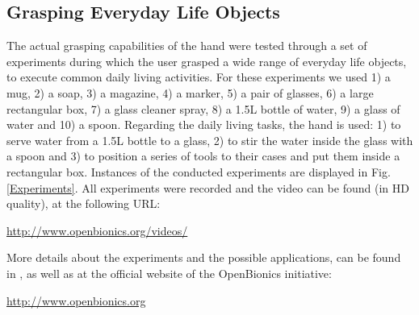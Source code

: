 \subsection{Grasping Everyday Life Objects}

The actual grasping capabilities of the hand were tested through a set of experiments during which the user grasped a wide range of everyday life objects, to execute common daily living activities. For these experiments we used 1) a mug, 2) a soap, 3) a magazine, 4)  a marker, 5) a pair of glasses, 6) a large rectangular box, 7) a glass cleaner spray, 8) a 1.5L bottle of water, 9) a glass of water and 10) a spoon. Regarding the daily living tasks, the hand is used: 1) to serve water from a 1.5L bottle to a glass, 2) to stir the water inside the glass with a spoon and 3) to position a series of tools to their cases and put them inside a rectangular box. Instances of the conducted experiments are displayed in Fig. \ref{Experiments}. All experiments were recorded and the video can be found (in HD quality), at the following URL: 
\begin{center}{\small{\url{http://www.openbionics.org/videos/}}}\end{center}

More details about the experiments and the possible applications, can be found in \cite{Kontoudis2015IROS}, as well as at the official website of the OpenBionics initiative:

\begin{center}
{\url{http://www.openbionics.org}}
\end{center} 

